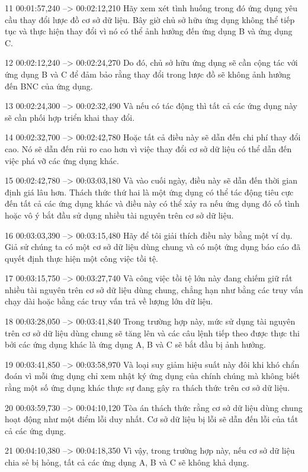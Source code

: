 11
00:01:57,240 --> 00:02:12,210
Hãy xem xét tình huống trong đó ứng dụng yêu cầu thay đổi lược đồ cơ sở dữ liệu.  Bây giờ chủ sở hữu ứng dụng không thể tiếp tục và thực hiện thay đổi vì nó có thể ảnh hưởng đến ứng dụng B và ứng dụng C.

12
00:02:12,240 --> 00:02:24,270
Do đó, chủ sở hữu ứng dụng sẽ cần cộng tác với ứng dụng B và C để đảm bảo rằng thay đổi trong lược đồ sẽ không ảnh hưởng đến BNC của ứng dụng.

13
00:02:24,300 --> 00:02:32,490
Và nếu có tác động thì tất cả các ứng dụng này sẽ cần phối hợp triển khai thay đổi.

14
00:02:32,700 --> 00:02:42,780
Hoặc tất cả điều này sẽ dẫn đến chi phí thay đổi cao.  Nó sẽ dẫn đến rủi ro cao hơn vì việc thay đổi cơ sở dữ liệu có thể dẫn đến việc phá vỡ các ứng dụng khác.

15
00:02:42,780 --> 00:03:03,180
Và vào cuối ngày, điều này sẽ dẫn đến thời gian định giá lâu hơn.  Thách thức thứ hai là một ứng dụng có thể tác động tiêu cực đến tất cả các ứng dụng khác và điều này có thể xảy ra nếu ứng dụng đó cố tình hoặc vô ý bắt đầu sử dụng nhiều tài nguyên trên cơ sở dữ liệu.

16
00:03:03,390 --> 00:03:15,480
Hãy để tôi giải thích điều này bằng một ví dụ.  Giả sử chúng ta có một cơ sở dữ liệu dùng chung và có một ứng dụng báo cáo đã quyết định thực hiện một công việc tồi tệ.

17
00:03:15,750 --> 00:03:27,740
Và công việc tồi tệ lớn này đang chiếm giữ rất nhiều tài nguyên trên cơ sở dữ liệu dùng chung, chẳng hạn như bằng các truy vấn chạy dài hoặc bằng các truy vấn trả về lượng lớn dữ liệu.

18
00:03:28,050 --> 00:03:41,840
Trong trường hợp này, mức sử dụng tài nguyên trên cơ sở dữ liệu dùng chung sẽ tăng lên và các câu lệnh tiếp theo được thực thi bởi các ứng dụng khác là ứng dụng A, B và C sẽ bắt đầu bị ảnh hưởng.

19
00:03:41,850 --> 00:03:58,970
Và loại suy giảm hiệu suất này đôi khi khó chẩn đoán vì mỗi ứng dụng chỉ xem nhật ký ứng dụng của chính chúng mà không biết rằng một số ứng dụng khác thực sự đang gây ra thách thức trên cơ sở dữ liệu.

20
00:03:59,730 --> 00:04:10,120
Tòa án thách thức rằng cơ sở dữ liệu dùng chung hoạt động như một điểm lỗi duy nhất.  Cơ sở dữ liệu bị lỗi sẽ dẫn đến lỗi của tất cả các ứng dụng.

21
00:04:10,380 --> 00:04:18,350
Vì vậy, trong trường hợp này, nếu cơ sở dữ liệu chia sẻ bị hỏng, tất cả các ứng dụng A, B và C sẽ không khả dụng.

